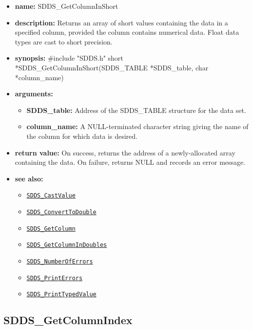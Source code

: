 \documentclass[11pt]{article}
\newcommand{\progref}[1]{\hyperref[SDDS_#1]{\tt SDDS\_#1}}
\begin{document}
\begin{itemize}
\item {\bf name:}\newline
SDDS\_GetColumnInShort
\item {\bf description:}\newline
Returns an array of short values containing the data in a specified column, provided the column contains numerical data. Float data types are cast to short precision.
\item {\bf synopsis:} \#include "SDDS.h"\newline
short *SDDS\_GetColumnInShort(SDDS\_TABLE *SDDS\_table, char *column\_name)
\item {\bf arguments:}
\begin{itemize}
\item {\bf SDDS\_table:} Address of the SDDS\_TABLE structure for the data set.
\item {\bf column\_name:} A NULL-terminated character string giving the name of the column for which data is desired.
\end{itemize}
\item {\bf return value:}\newline
On success, returns the address of a newly-allocated array containing the data. On failure, returns NULL and records an error message.
\item {\bf see also:}
\begin{itemize}
\item \progref{CastValue}
\item \progref{ConvertToDouble}
\item \progref{GetColumn}
\item \progref{GetColumnInDoubles}
\item \progref{NumberOfErrors}
\item \progref{PrintErrors}
\item \progref{PrintTypedValue}
\end{itemize}
\end{itemize}

\subsection{SDDS\_GetColumnIndex}
\label{SDDS_GetColumnIndex}
\end{document}
